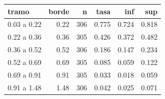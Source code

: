 \begin{tabular}{lrrrrr}
\toprule
tramo & borde & n & tasa & inf & sup \\
\midrule
0.03 a 0.22 & 0.22 & 306 & 0.775 & 0.724 & 0.818 \\
0.22 a 0.36 & 0.36 & 305 & 0.426 & 0.372 & 0.482 \\
0.36 a 0.52 & 0.52 & 306 & 0.186 & 0.147 & 0.234 \\
0.52 a 0.69 & 0.69 & 305 & 0.085 & 0.059 & 0.122 \\
0.69 a 0.91 & 0.91 & 305 & 0.033 & 0.018 & 0.059 \\
0.91 a 1.48 & 1.48 & 306 & 0.042 & 0.025 & 0.071 \\
\bottomrule
\end{tabular}

